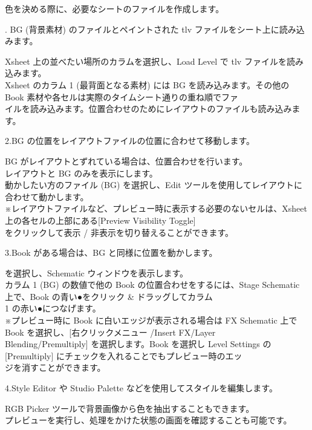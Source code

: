 \documentclass[a4paper,10pt]{article}
\begin{document}
\footnotesize
\noindent 色を決める際に、必要なシートのファイルを作成します。\\
\par
\normalsize
{}. BG (背景素材) のファイルとペイントされた tlv ファイルをシート上に読み込みます。\par
\footnotesize
\noindent Xsheet 上の並べたい場所のカラムを選択し、Load Level で tlv ファイルを読み込みます。\\
Xsheet のカラム 1 (最背面となる素材) には BG を読み込みます。その他の Book 素材や各セルは実際のタイムシート通りの重ね順でファ\\
イルを読み込みます。位置合わせのためにレイアウトのファイルも読み込みます。\\
\par
\normalsize
\noindent 2.BG の位置をレイアウトファイルの位置に合わせて移動します。\par
\footnotesize
\noindent BG がレイアウトとずれている場合は、位置合わせを行います。\\
レイアウトと BG のみを表示にします。\\
動かしたい方のファイル (BG) を選択し、Edit ツールを使用してレイアウトに合わせて動かします。\\
※レイアウトファイルなど、プレビュー時に表示する必要のないセルは、Xsheet上の各セルの上部にある[Preview\,\,Visibility Toggle]\\
をクリックして表示 / 非表示を切り替えることができます。\\
\par
\normalsize
\noindent 3.Book がある場合は、BG と同様に位置を動かします。\par
\footnotesize
{} を選択し、Schematic ウィンドウを表示します。\\
カラム 1 (BG) の数値で他の Book の位置合わせをするには、Stage Schematic 上で、Book の青い●をクリック \& ドラッグしてカラム\\
1 の赤い●につなげます。\\
※プレビュー時に Book に白いエッジが表示される場合は FX Schematic 上で Book を選択し、[右クリックメニュー /Insert FX/Layer\\
Blending/Premultiply] を選択します。Book を選択し Level Settings の [Premultiply] にチェックを入れることでもプレビュー時のエッ\\
ジを消すことができます。\\
\par
\normalsize
\noindent 4.Style Editor や Studio Palette などを使用してスタイルを編集します。\par
\footnotesize
\noindent RGB Picker ツールで背景画像から色を抽出することもできます。\\
プレビューを実行し、処理をかけた状態の画面を確認することも可能です。\\
\\
\end{document}

